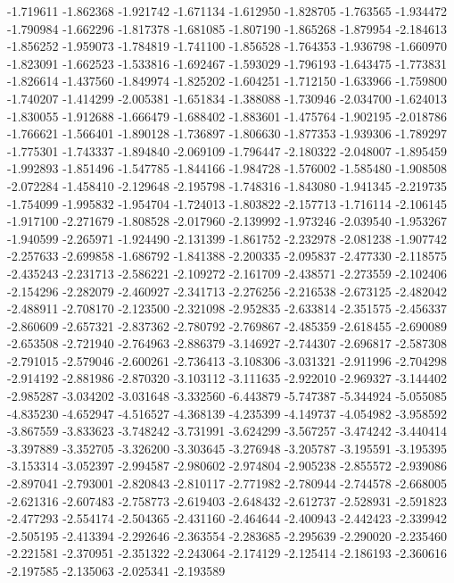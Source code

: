 -1.719611
-1.862368
-1.921742
-1.671134
-1.612950
-1.828705
-1.763565
-1.934472
-1.790984
-1.662296
-1.817378
-1.681085
-1.807190
-1.865268
-1.879954
-2.184613
-1.856252
-1.959073
-1.784819
-1.741100
-1.856528
-1.764353
-1.936798
-1.660970
-1.823091
-1.662523
-1.533816
-1.692467
-1.593029
-1.796193
-1.643475
-1.773831
-1.826614
-1.437560
-1.849974
-1.825202
-1.604251
-1.712150
-1.633966
-1.759800
-1.740207
-1.414299
-2.005381
-1.651834
-1.388088
-1.730946
-2.034700
-1.624013
-1.830055
-1.912688
-1.666479
-1.688402
-1.883601
-1.475764
-1.902195
-2.018786
-1.766621
-1.566401
-1.890128
-1.736897
-1.806630
-1.877353
-1.939306
-1.789297
-1.775301
-1.743337
-1.894840
-2.069109
-1.796447
-2.180322
-2.048007
-1.895459
-1.992893
-1.851496
-1.547785
-1.844166
-1.984728
-1.576002
-1.585480
-1.908508
-2.072284
-1.458410
-2.129648
-2.195798
-1.748316
-1.843080
-1.941345
-2.219735
-1.754099
-1.995832
-1.954704
-1.724013
-1.803822
-2.157713
-1.716114
-2.106145
-1.917100
-2.271679
-1.808528
-2.017960
-2.139992
-1.973246
-2.039540
-1.953267
-1.940599
-2.265971
-1.924490
-2.131399
-1.861752
-2.232978
-2.081238
-1.907742
-2.257633
-2.699858
-1.686792
-1.841388
-2.200335
-2.095837
-2.477330
-2.118575
-2.435243
-2.231713
-2.586221
-2.109272
-2.161709
-2.438571
-2.273559
-2.102406
-2.154296
-2.282079
-2.460927
-2.341713
-2.276256
-2.216538
-2.673125
-2.482042
-2.488911
-2.708170
-2.123500
-2.321098
-2.952835
-2.633814
-2.351575
-2.456337
-2.860609
-2.657321
-2.837362
-2.780792
-2.769867
-2.485359
-2.618455
-2.690089
-2.653508
-2.721940
-2.764963
-2.886379
-3.146927
-2.744307
-2.696817
-2.587308
-2.791015
-2.579046
-2.600261
-2.736413
-3.108306
-3.031321
-2.911996
-2.704298
-2.914192
-2.881986
-2.870320
-3.103112
-3.111635
-2.922010
-2.969327
-3.144402
-2.985287
-3.034202
-3.031648
-3.332560
-6.443879
-5.747387
-5.344924
-5.055085
-4.835230
-4.652947
-4.516527
-4.368139
-4.235399
-4.149737
-4.054982
-3.958592
-3.867559
-3.833623
-3.748242
-3.731991
-3.624299
-3.567257
-3.474242
-3.440414
-3.397889
-3.352705
-3.326200
-3.303645
-3.276948
-3.205787
-3.195591
-3.195395
-3.153314
-3.052397
-2.994587
-2.980602
-2.974804
-2.905238
-2.855572
-2.939086
-2.897041
-2.793001
-2.820843
-2.810117
-2.771982
-2.780944
-2.744578
-2.668005
-2.621316
-2.607483
-2.758773
-2.619403
-2.648432
-2.612737
-2.528931
-2.591823
-2.477293
-2.554174
-2.504365
-2.431160
-2.464644
-2.400943
-2.442423
-2.339942
-2.505195
-2.413394
-2.292646
-2.363554
-2.283685
-2.295639
-2.290020
-2.235460
-2.221581
-2.370951
-2.351322
-2.243064
-2.174129
-2.125414
-2.186193
-2.360616
-2.197585
-2.135063
-2.025341
-2.193589
